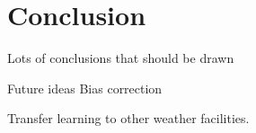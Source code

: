 \chapter{Conclusion}

Lots of conclusions that should be drawn

Future ideas
Bias correction

Transfer learning to other weather facilities.
\cite{raissi}
